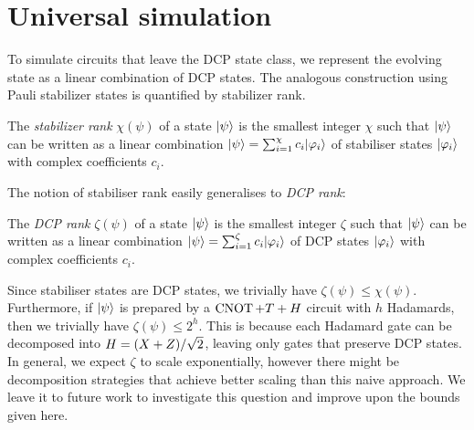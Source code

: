 \section{Universal simulation}
\label{sec:universal-simulation}

To simulate circuits that leave the DCP state class, we represent the evolving state as a linear combination of DCP states. The analogous construction using Pauli stabilizer states is quantified by stabilizer rank.

\begin{definition}\label{def:stabilizer-rank}
    The \emph{stabilizer rank} $\chi(\psi)$ of a state $|\psi\rangle$ is the smallest integer $\chi$ such that $|\psi\rangle$ can be written as a linear combination $|\psi\rangle = \sum_{i=1}^\chi c_i|\varphi_i\rangle$ of stabiliser states $|\varphi_i\rangle$ with complex coefficients $c_i$.
\end{definition}

The notion of stabiliser rank easily generalises to \emph{DCP rank}:

\begin{definition}\label{def:dcp-rank}
    The \emph{DCP rank} $\zeta(\psi)$ of a state $|\psi\rangle$ is the smallest integer $\zeta$ such that $|\psi\rangle$ can be written as a linear combination $|\psi\rangle = \sum_{i=1}^\zeta c_i|\varphi_i\rangle$ of DCP states $|\varphi_i\rangle$ with complex coefficients $c_i$.
\end{definition}

Since stabiliser states are DCP states, we trivially have $\zeta(\psi) \leq \chi(\psi)$.
Furthermore, if $|\psi\rangle$ is prepared by a $\operatorname{CNOT}+T+H$ circuit with $h$ Hadamards, then we trivially have $\zeta(\psi) \leq 2^h$.
This is because each Hadamard gate can be decomposed into $H = (X + Z) / \sqrt 2$, leaving only gates that preserve DCP states.
In general, we expect $\zeta$ to scale exponentially, however there might be decomposition strategies that achieve better scaling than this naive approach.
We leave it to future work to investigate this question and improve upon the bounds given here.

